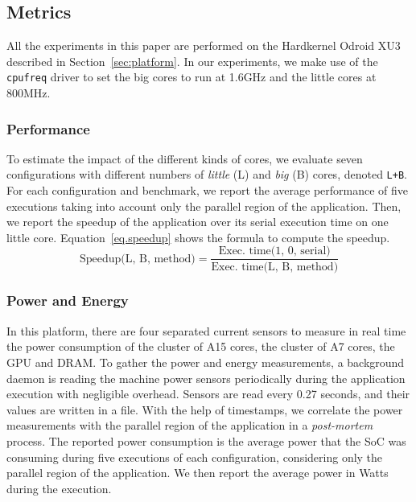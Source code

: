 \subsection{Metrics}
\label{sec:metrics}

All the experiments in this paper are performed on the Hardkernel Odroid XU3 described in Section~\ref{sec:platform}. In our experiments, we make use of the \texttt{cpufreq} driver to set the big cores to run at 1.6GHz and the little cores at 800MHz. 

\subsubsection{Performance}
To estimate the impact of the different kinds of cores, we evaluate seven configurations with different numbers of \textit{little} (L) and \textit{big} (B) cores, denoted \texttt{L+B}.
For each configuration and benchmark, we report the average performance of five executions taking into account only the parallel region of the application. Then, we report the speedup of the application over its serial execution time on one little core.
Equation~\ref{eq.speedup} shows the formula to compute the speedup.
\begingroup\makeatletter\def\f@size{9}\check@mathfonts
\begin{equation}
  \text{Speedup(L, B, method)} = \frac{\text{Exec. time(1, 0, serial)}}{\text{Exec. time(L, B, method)}}
\label{eq.speedup}
\end{equation}
\endgroup

\subsubsection{Power and Energy}
In this platform, there are four separated current sensors to measure in real time the power consumption of the cluster of A15 cores, the cluster of A7 cores, the GPU and DRAM. 
To gather the power and energy measurements, a background daemon is reading the machine power sensors periodically during the application execution with negligible overhead. Sensors are read every 0.27 seconds, and their values are written in a file. With the help of timestamps, we correlate the power measurements with the parallel region of the application in a  \emph{post-mortem} process. The reported power consumption is the average power that the SoC was consuming during five executions of each configuration, considering only the parallel region of the application. We then report the average power in Watts during the execution. 

